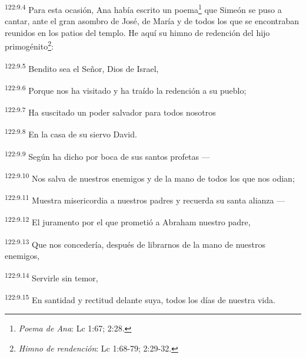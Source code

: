 \par
\textsuperscript{122:9.4} Para esta ocasión, Ana había escrito un poema\footnote{\textit{Poema de Ana}: Lc 1:67; 2:28.} que Simeón se puso a cantar, ante el gran asombro de José, de María y de todos los que se encontraban reunidos en los patios del templo. He aquí su himno de redención del hijo primogénito\footnote{\textit{Himno de rendención}: Lc 1:68-79; 2:29-32.}:

\par
\textsuperscript{122:9.5} Bendito sea el Señor, Dios de Israel,

\par
\textsuperscript{122:9.6} Porque nos ha visitado y ha traído la redención a su pueblo;

\par
\textsuperscript{122:9.7} Ha suscitado un poder salvador para todos nosotros

\par
\textsuperscript{122:9.8} En la casa de su siervo David.

\par
\textsuperscript{122:9.9} Según ha dicho por boca de sus santos profetas ---

\par
\textsuperscript{122:9.10} Nos salva de nuestros enemigos y de la mano de todos los que nos odian;

\par
\textsuperscript{122:9.11} Muestra misericordia a nuestros padres y recuerda su santa alianza ---

\par
\textsuperscript{122:9.12} El juramento por el que prometió a Abraham nuestro padre,

\par
\textsuperscript{122:9.13} Que nos concedería, después de librarnos de la mano de nuestros enemigos,

\par
\textsuperscript{122:9.14} Servirle sin temor,

\par
\textsuperscript{122:9.15} En santidad y rectitud delante suya, todos los días de nuestra vida.

